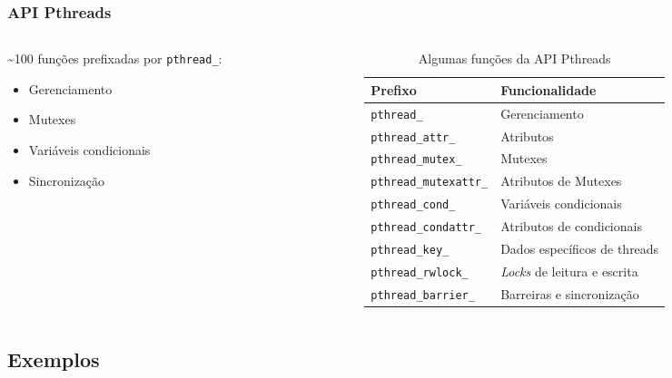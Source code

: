 \documentclass[10pt, compress, aspectratio=169, xcolor={table,usenames,dvipsnames}]{beamer}
\begin{document}
\begin{frame}
  \frametitle{API Pthreads}
  \begin{columns}
    \begin{column}{0.4\columnwidth}
      \alert{\textasciitilde{}100 funções} prefixadas por \texttt{pthread\_}:
      \begin{itemize}
      \item Gerenciamento
      \item Mutexes
      \item Variáveis condicionais
      \item Sincronização
      \end{itemize}
    \end{column}
    \begin{column}{0.6\columnwidth}
      \begin{table}[]
        \smaller[2]
        \centering
        \begin{tabular}{@{}ll@{}}
          \toprule
          \textbf{Prefixo} & \textbf{Funcionalidade} \\ \midrule
          \texttt{pthread\_} &  Gerenciamento \\
          \texttt{pthread\_attr\_} & Atributos \\
          \texttt{pthread\_mutex\_} &  Mutexes \\
          \texttt{pthread\_mutexattr\_} & Atributos de Mutexes \\
          \texttt{pthread\_cond\_} & Variáveis condicionais \\
          \texttt{pthread\_condattr\_} & Atributos de condicionais \\
          \texttt{pthread\_key\_} & Dados específicos de threads \\
          \texttt{pthread\_rwlock\_} & \textit{Locks} de leitura e escrita \\
          \texttt{pthread\_barrier\_} &  Barreiras e sincronização \\ \bottomrule
        \end{tabular}
        \caption{Algumas funções da API Pthreads}
      \end{table}
    \end{column}
  \end{columns}
\end{frame}

\subsection{Exemplos}
\end{document}
